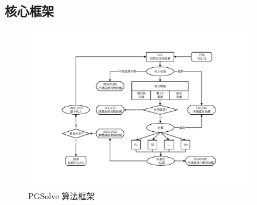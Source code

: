 \subsection{核心框架}
\begin{figure}[htbp]
\centering 
\includegraphics[width=0.9\textwidth]{fig/pgsolve.pdf}
\caption{PGSolve 算法框架}\label{PGSolve}
\end{figure}

